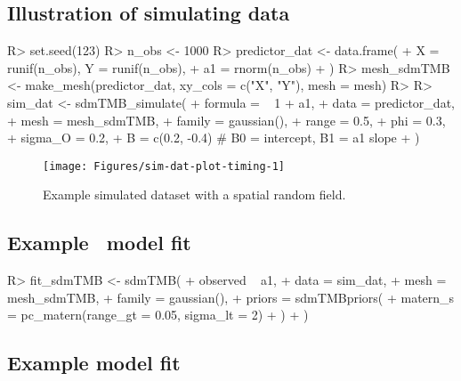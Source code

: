 \documentclass[article]{jss}\usepackage[]{graphicx}\usepackage[dvipsnames]{xcolor}
\newcommand{\sdmTMB}{\pkg{sdmTMB}}
\begin{document}
\subsection{Illustration of simulating data}

\begin{Schunk}
\begin{Sinput}
R> set.seed(123)
R> n_obs <- 1000
R> predictor_dat <- data.frame(
+    X = runif(n_obs), Y = runif(n_obs),
+    a1 = rnorm(n_obs)
+  )
R> mesh_sdmTMB <- make_mesh(predictor_dat, xy_cols = c("X", "Y"), mesh = mesh)
R>
R> sim_dat <- sdmTMB_simulate(
+    formula = ~ 1 + a1,
+    data = predictor_dat,
+    mesh = mesh_sdmTMB,
+    family = gaussian(),
+    range = 0.5,
+    phi = 0.3,
+    sigma_O = 0.2,
+    B = c(0.2, -0.4) # B0 = intercept, B1 = a1 slope
+  )
\end{Sinput}
\end{Schunk}


\begin{Schunk}
\begin{figure}[ht]

{\centering \texttt{[image: Figures/sim-dat-plot-timing-1]}

}

\caption[Example simulated dataset with a spatial random field]{Example simulated dataset with a spatial random field.}\label{fig:sim-dat-plot-timing}
\end{figure}
\end{Schunk}

\subsection[Example sdmTMB model fit]{Example \sdmTMB\ model fit}

\begin{Schunk}
\begin{Sinput}
R> fit_sdmTMB <- sdmTMB(
+    observed ~ a1,
+    data = sim_dat,
+    mesh = mesh_sdmTMB,
+    family = gaussian(),
+    priors = sdmTMBpriors(
+      matern_s = pc_matern(range_gt = 0.05, sigma_lt = 2)
+    )
+  )
\end{Sinput}
\end{Schunk}

\subsection[Example spaMM model fit]{Example  model fit}
\end{document}
